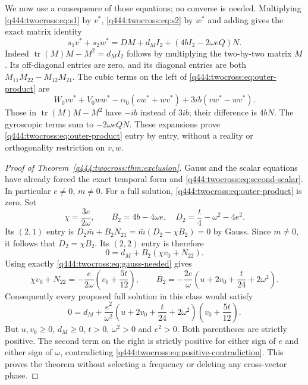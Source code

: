 We now use a consequence of those equations; no converse is needed.
Multiplying \eqref{q444:twocross:eq:s1} by $v^*$, \eqref{q444:twocross:eq:s2} by $w^*$ and adding
gives the exact matrix identity
\begin{equation}
s_1v^*+s_2w^*
=DM+d_MI_2+(4bI_2-2\omega eQ)N.
\label{q444:twocross:eq:outer-product}
\end{equation}
Indeed $\operatorname{tr}(M)M-M^2=d_MI_2$ follows by multiplying
the two-by-two matrix $M$. Its off-diagonal entries are zero, and its
diagonal entries are both $M_{11}M_{22}-M_{12}M_{21}$.
The cubic terms on the left of \eqref{q444:twocross:eq:outer-product} are
\[
W_0vv^*+V_0ww^*-\alpha_0(vw^*+wv^*)+3ib(vw^*-wv^*).
\]
Those in $\operatorname{tr}(M)M-M^2$ have $-ib$ instead of $3ib$;
their difference is $4bN$. The gyroscopic terms sum to
$-2\omega eQN$. These expansions prove \eqref{q444:twocross:eq:outer-product}
entry by entry, without a reality or orthogonality restriction on $v,w$.

\begin{proof}[Proof of Theorem~\ref{q444:twocross:thm:exclusion}]
Gauss and the scalar equations have already forced the exact temporal
form and \eqref{q444:twocross:eq:second-scalar}. In particular $e\ne0$, $m\ne0$.
For a full solution, \eqref{q444:twocross:eq:outer-product} is zero. Set
\[
\chi=\frac{3e}{2\omega},\qquad B_2=4b-4\omega e,
\quad D_2=\frac t4-\omega^2-4e^2.
\]
Its $(2,1)$ entry is
$D_2\bar m+B_2N_{21}=\bar m(D_2-\chi B_2)=0$ by Gauss.
Since $m\ne0$, it follows that $D_2=\chi B_2$.
Its $(2,2)$ entry is therefore
\[
0=d_M+B_2(\chi v_0+N_{22}).
\]
Using exactly \eqref{q444:twocross:eq:gauss-needed} gives
\[
\chi v_0+N_{22}=-\frac e{2\omega}\left(v_0+\frac{5t}{12}\right),
\qquad
B_2=-\frac{2e}{\omega}
 \left(u+2v_0+\frac t{24}+2\omega^2\right).
\]
Consequently every proposed full solution in this class would satisfy
\begin{equation}
0=d_M+\frac{e^2}{\omega^2}
\left(u+2v_0+\frac t{24}+2\omega^2\right)
\left(v_0+\frac{5t}{12}\right).
\label{q444:twocross:eq:positive-contradiction}
\end{equation}
But $u,v_0\ge0$, $d_M\ge0$, $t>0$, $\omega^2>0$ and $e^2>0$.
Both parentheses are strictly positive. The second term on the right
is strictly positive for either sign of $e$ and either sign of $\omega$,
contradicting \eqref{q444:twocross:eq:positive-contradiction}. This proves the theorem
without selecting a frequency or deleting any cross-vector phase.
\end{proof}


